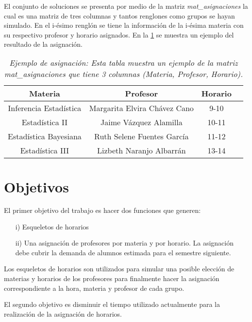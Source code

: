 El conjunto de soluciones se presenta por medio de la matriz \textit{mat\_asignaciones} la cual es una matriz de tres columnas y tantos renglones como grupos se hayan simulado. En el i-ésimo renglón se tiene la información de la i-ésima materia con su respectivo profesor y horario asignados. En la \tablename{\ref{EjAsig}} se muestra un ejemplo del resultado de la asignación.

\begin{table}[H]
\centering
\begin{tabular}{|c|c|c|c|}
\hline 
\textbf{Materia} & \textbf{Profesor} & \textbf{Horario} \\ 
\hline 
Inferencia Estadística & Margarita Elvira Chávez Cano & 9-10 \\ 
\hline 
Estadística II & Jaime Vázquez Alamilla & 10-11 \\ 
\hline 
Estadística Bayesiana  & Ruth Selene Fuentes García & 11-12 \\ 
\hline 
Estadística III  & Lizbeth Naranjo Albarrán & 13-14 \\ 
\hline 
\end{tabular}  
\caption[\textit{Ejemplo de asignación}]{\textit{Ejemplo de asignación: Esta tabla muestra un ejemplo de la matriz mat\_asignaciones que tiene 3 columnas (Materia, Profesor, Horario).}}\label{EjAsig}
\end{table}


\section{Objetivos}

El primer objetivo del trabajo es hacer dos funciones que generen:
  
  \begin{enumerate}
\item[i)] Esqueletos de horarios

\item[ii)] Una asignación de profesores por materia y por horario. La asignación debe cubrir la demanda de alumnos estimada para el semestre siguiente.
\end{enumerate}


Los esqueletos de horarios son utilizados para simular una posible elección de materias y horarios de los profesores para finalmente hacer la asignación correspondiente a la hora, materia y profesor de cada grupo.

El segundo objetivo es disminuir el tiempo utilizado actualmente para la realización de la asignación de horarios.


